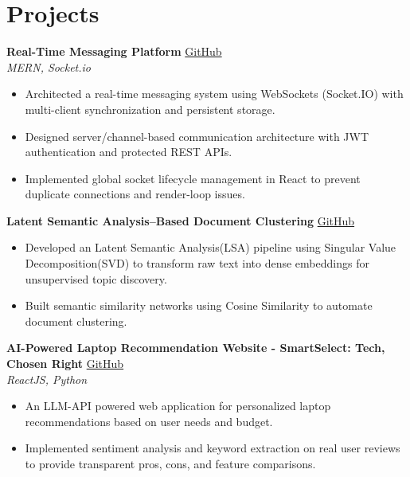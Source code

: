 \documentclass[a4paper, 8pt]{article}
\begin{document}
\section*{Projects}
\textbf{Real-Time Messaging Platform} \hfill \href{https://github.com/naazie/TheHumanDiscord}{GitHub}\\
\textit{MERN, Socket.io}
\begin{itemize}
    \item Architected a real-time messaging system using WebSockets (Socket.IO) with multi-client synchronization and persistent storage.
    \item Designed server/channel-based communication architecture with JWT authentication and protected REST APIs.
    \item Implemented global socket lifecycle management in React to prevent duplicate connections and render-loop issues.
\end{itemize}
\vspace{2pt}

\textbf{Latent Semantic Analysis–Based Document Clustering} \hfill \href{https://github.com/naazie/ML-ISE2-Final}{GitHub}
\begin{itemize}
    \item Developed an Latent Semantic Analysis(LSA) pipeline using Singular Value Decomposition(SVD) to transform raw text into dense embeddings for unsupervised topic discovery.
    \item Built semantic similarity networks using Cosine Similarity to automate document clustering.
\end{itemize}
\vspace{2pt}

\textbf{AI-Powered Laptop Recommendation Website - SmartSelect: Tech, Chosen Right} \hfill 
\href{https://github.com/naazie/SmartSelect-AI-Powered-Laptop-Recommendation}{GitHub}\\
\textit{ReactJS, Python }
\begin{itemize}
    \item An LLM-API powered web application for personalized laptop recommendations based on user needs and budget.
    \item Implemented sentiment analysis and keyword extraction on real user reviews to provide transparent pros, cons, and feature comparisons.
\end{itemize}

\end{document}
